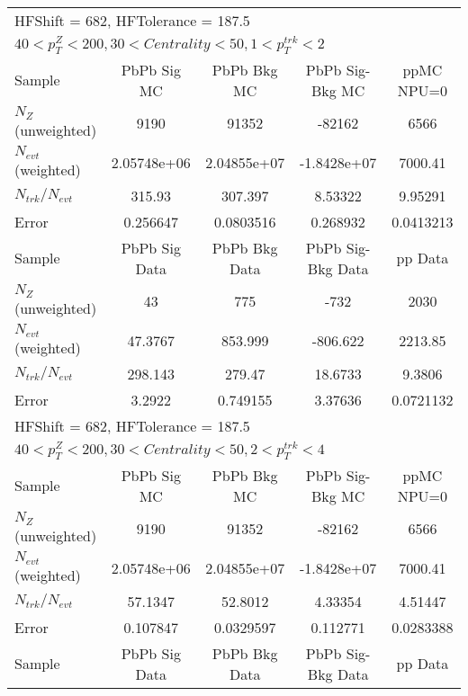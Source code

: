 \clearpage
\begin{table}[h!]
\centering
\begin{tabular}{|l|c|c|c|c|}
\multicolumn{5}{l}{ HFShift = 682, HFTolerance = 187.5}\\
\multicolumn{5}{l}{ $40 < p_{T}^{Z} < 200, 30 < Centrality < 50, 1 < p_{T}^{trk} < 2$}\\
\hline\hline
Sample         & PbPb Sig MC    & PbPb Bkg MC    & PbPb Sig-Bkg MC& ppMC NPU=0     \\
$N_Z$ (unweighted)& 9190           & 91352          & -82162         & 6566           \\
$N_{evt}$ (weighted)& 2.05748e+06    & 2.04855e+07    & -1.8428e+07    & 7000.41        \\
$N_{trk}/N_{evt}$& 315.93         & 307.397        & 8.53322        & 9.95291        \\
Error          & 0.256647       & 0.0803516      & 0.268932       & 0.0413213      \\
\hline
Sample         & PbPb Sig Data  & PbPb Bkg Data  & PbPb Sig-Bkg Data& pp Data  \\
$N_Z$ (unweighted)& 43             & 775            & -732           & 2030           \\
$N_{evt}$ (weighted)& 47.3767        & 853.999        & -806.622       & 2213.85        \\
$N_{trk}/N_{evt}$& 298.143        & 279.47         & 18.6733        & 9.3806         \\
Error          & 3.2922         & 0.749155       & 3.37636        & 0.0721132      \\
\hline\hline
\multicolumn{5}{l}{ HFShift = 682, HFTolerance = 187.5}\\
\multicolumn{5}{l}{ $40 < p_{T}^{Z} < 200, 30 < Centrality < 50, 2 < p_{T}^{trk} < 4$}\\
\hline\hline
Sample         & PbPb Sig MC    & PbPb Bkg MC    & PbPb Sig-Bkg MC& ppMC NPU=0     \\
$N_Z$ (unweighted)& 9190           & 91352          & -82162         & 6566           \\
$N_{evt}$ (weighted)& 2.05748e+06    & 2.04855e+07    & -1.8428e+07    & 7000.41        \\
$N_{trk}/N_{evt}$& 57.1347        & 52.8012        & 4.33354        & 4.51447        \\
Error          & 0.107847       & 0.0329597      & 0.112771       & 0.0283388      \\
\hline
Sample         & PbPb Sig Data  & PbPb Bkg Data  & PbPb Sig-Bkg Data& pp Data  \\

\end{tabular}
\end{table}

